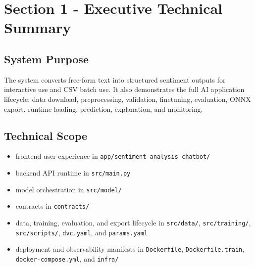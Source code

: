 
\section{Section 1 - Executive Technical Summary}
\subsection{System Purpose}
The system converts free-form text into structured sentiment outputs for interactive use and CSV batch use. It also demonstrates the full AI application lifecycle: data download, preprocessing, validation, finetuning, evaluation, ONNX export, runtime loading, prediction, explanation, and monitoring.

\subsection{Technical Scope}
\begin{itemize}[leftmargin=1.2em]
  \item frontend user experience in \texttt{app/sentiment-analysis-chatbot/}
  \item backend API runtime in \texttt{src/main.py}
  \item model orchestration in \texttt{src/model/}
  \item contracts in \texttt{contracts/}
  \item data, training, evaluation, and export lifecycle in \texttt{src/data/}, \texttt{src/training/}, \texttt{src/scripts/}, \texttt{dvc.yaml}, and \texttt{params.yaml}
  \item deployment and observability manifests in \texttt{Dockerfile}, \texttt{Dockerfile.train}, \texttt{docker-compose.yml}, and \texttt{infra/}
\end{itemize}

